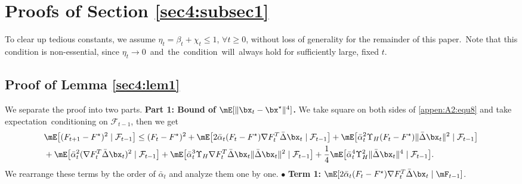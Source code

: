 \section{Proofs of Section \ref{sec4:subsec1}}

To clear up tedious constants, we assume $\eta_t=\beta_t+\chi_t\leq 1$, $\forall t\geq 0$, without loss of generality for the remainder of this paper.~Note that this condition is non-essential, since $\eta_t \rightarrow 0$~and~the~\mbox{condition}~will~always hold for sufficiently large, fixed $t$.


\subsection{Proof of Lemma \ref{sec4:lem1}}\label{pf:xtbound}

We separate the proof into two parts. 
\vskip4pt
\noindent \textbf{Part 1: Bound of $\mE[\|\bx_t-\bx^\star\|^4]$.} We take square on both sides of \eqref{appen:A2:equ8} and take expectation~conditioning on $\mathcal{F}_{t-1}$, then we get
\begin{align}\label{appen:A3:equ1}
& \mE\big[(F_{t+1}-F^\star)^2\mid \mathcal{F}_{t-1}\big] \leq (F_t-F^\star)^2+\mE\big[2 \bar{\alpha}_t(F_t-F^\star) \nabla F_t^T \bar{\Delta} \bx_t\mid \mathcal{F}_{t-1}\big] + \mE\big[\bar{\alpha}_t^2 \Upsilon_{H}(F_t-F^\star)\|\bar{\Delta} \bx_t\|^2\mid \mathcal{F}_{t-1}\big] \nonumber \\
& +\mE\big[\bar{\alpha}_t^2(\nabla F_t^{T} \bar{\Delta} \bx_t)^2\mid \mathcal{F}_{t-1}\big] + \mE\big[\bar{\alpha}_t^3 \Upsilon_{H} \nabla F_t^{T} \bar{\Delta}\bx_t\|\bar{\Delta} \bx_t\|^2\mid \mathcal{F}_{t-1}\big] +\frac{1}{4}\mE\big[\bar{\alpha}_t^4 \Upsilon_{H}^2\|\bar{\Delta} \bx_t\|^4\mid \mathcal{F}_{t-1}\big].
\end{align}
We rearrange these terms by the order of $\bar{\alpha}_t$ and analyze them one by one.
\vskip4pt
\noindent $\bullet$ \textbf{Term 1:} $\mE[2 \bar{\alpha}_t(F_t-F^\star) \nabla F_t^T \bar{\Delta} \bx_t\mid \mF_{t-1}]$.

